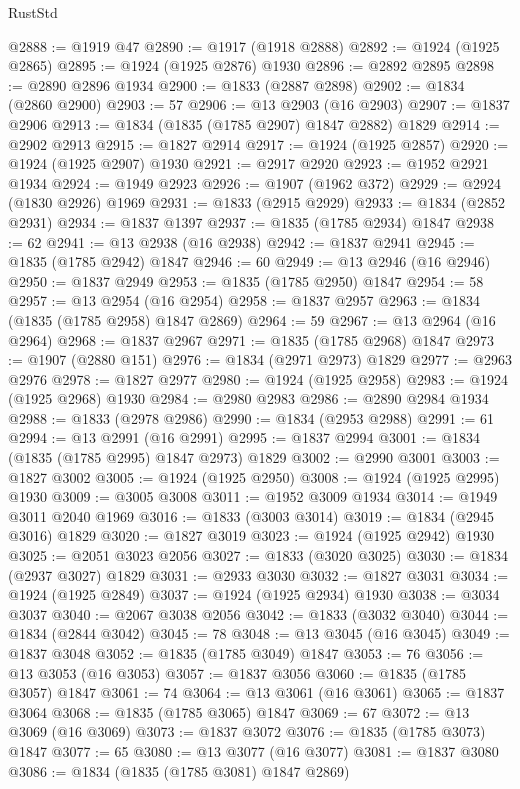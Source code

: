 \begin{lexlean}{RustStd}
\begin{coremodule}
@2888 := @1919 @47
@2890 := @1917 (@1918 @2888)
@2892 := @1924 (@1925 @2865)
@2895 := @1924 (@1925 @2876) @1930
@2896 := @2892 @2895
@2898 := @2890 @2896 @1934
@2900 := @1833 (@2887 @2898)
@2902 := @1834 (@2860 @2900)
@2903 := 57
@2906 := @13 @2903 (@16 @2903)
@2907 := @1837 @2906
@2913 := @1834 (@1835 (@1785 @2907) @1847 @2882) @1829
@2914 := @2902 @2913
@2915 := @1827 @2914
@2917 := @1924 (@1925 @2857)
@2920 := @1924 (@1925 @2907) @1930
@2921 := @2917 @2920
@2923 := @1952 @2921 @1934
@2924 := @1949 @2923
@2926 := @1907 (@1962 @372)
@2929 := @2924 (@1830 @2926) @1969
@2931 := @1833 (@2915 @2929)
@2933 := @1834 (@2852 @2931)
@2934 := @1837 @1397
@2937 := @1835 (@1785 @2934) @1847
@2938 := 62
@2941 := @13 @2938 (@16 @2938)
@2942 := @1837 @2941
@2945 := @1835 (@1785 @2942) @1847
@2946 := 60
@2949 := @13 @2946 (@16 @2946)
@2950 := @1837 @2949
@2953 := @1835 (@1785 @2950) @1847
@2954 := 58
@2957 := @13 @2954 (@16 @2954)
@2958 := @1837 @2957
@2963 := @1834 (@1835 (@1785 @2958) @1847 @2869)
@2964 := 59
@2967 := @13 @2964 (@16 @2964)
@2968 := @1837 @2967
@2971 := @1835 (@1785 @2968) @1847
@2973 := @1907 (@2880 @151)
@2976 := @1834 (@2971 @2973) @1829
@2977 := @2963 @2976
@2978 := @1827 @2977
@2980 := @1924 (@1925 @2958)
@2983 := @1924 (@1925 @2968) @1930
@2984 := @2980 @2983
@2986 := @2890 @2984 @1934
@2988 := @1833 (@2978 @2986)
@2990 := @1834 (@2953 @2988)
@2991 := 61
@2994 := @13 @2991 (@16 @2991)
@2995 := @1837 @2994
@3001 := @1834 (@1835 (@1785 @2995) @1847 @2973) @1829
@3002 := @2990 @3001
@3003 := @1827 @3002
@3005 := @1924 (@1925 @2950)
@3008 := @1924 (@1925 @2995) @1930
@3009 := @3005 @3008
@3011 := @1952 @3009 @1934
@3014 := @1949 @3011 @2040 @1969
@3016 := @1833 (@3003 @3014)
@3019 := @1834 (@2945 @3016) @1829
@3020 := @1827 @3019
@3023 := @1924 (@1925 @2942) @1930
@3025 := @2051 @3023 @2056
@3027 := @1833 (@3020 @3025)
@3030 := @1834 (@2937 @3027) @1829
@3031 := @2933 @3030
@3032 := @1827 @3031
@3034 := @1924 (@1925 @2849)
@3037 := @1924 (@1925 @2934) @1930
@3038 := @3034 @3037
@3040 := @2067 @3038 @2056
@3042 := @1833 (@3032 @3040)
@3044 := @1834 (@2844 @3042)
@3045 := 78
@3048 := @13 @3045 (@16 @3045)
@3049 := @1837 @3048
@3052 := @1835 (@1785 @3049) @1847
@3053 := 76
@3056 := @13 @3053 (@16 @3053)
@3057 := @1837 @3056
@3060 := @1835 (@1785 @3057) @1847
@3061 := 74
@3064 := @13 @3061 (@16 @3061)
@3065 := @1837 @3064
@3068 := @1835 (@1785 @3065) @1847
@3069 := 67
@3072 := @13 @3069 (@16 @3069)
@3073 := @1837 @3072
@3076 := @1835 (@1785 @3073) @1847
@3077 := 65
@3080 := @13 @3077 (@16 @3077)
@3081 := @1837 @3080
@3086 := @1834 (@1835 (@1785 @3081) @1847 @2869)

\end{coremodule}
\end{lexlean}
